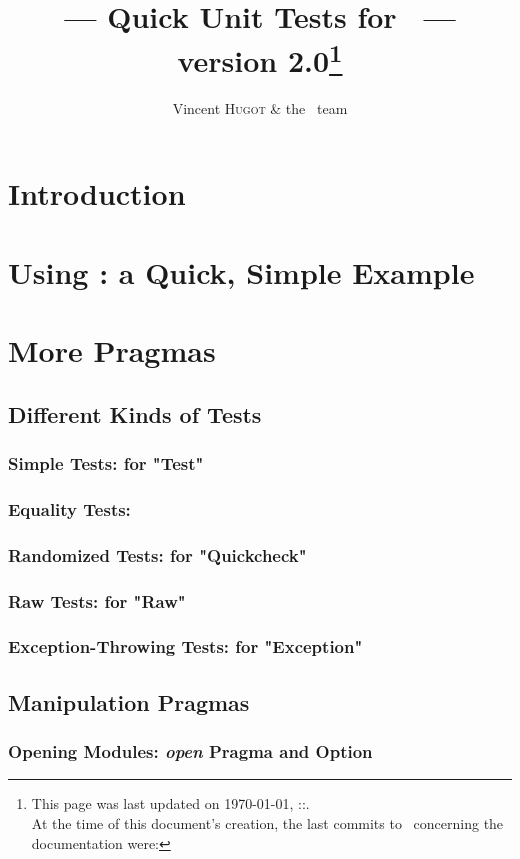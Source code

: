\documentclass[a4paper,12pt]{article}
\title{{\Huge\qtest}\\
--- Quick Unit Tests for \OCaml\ --- \\
version 2.0\footnote{
  This page was last updated on \today, \thehour:\theminute:\thesecond.\bigskip\\
%
At the time of this document's creation, the last commits to \bat\ concerning the documentation were:

%
%
}
}
\author{Vincent \textsc{Hugot} \& the \bat\ team}
\begin{document}
\maketitle
\tableofcontents

\section{Introduction}

\section{Using \qtest{} : a Quick, Simple Example}
    
\section{More \qtest{} Pragmas}
  \subsection{Different Kinds of Tests}
    \subsubsection{Simple Tests:  for "Test"}
    \subsubsection{Equality Tests: \textttl{=}}
    \subsubsection{Randomized Tests:  for "Quickcheck"}
    \subsubsection{Raw \ounit{} Tests:  for "Raw"}
    \subsubsection{Exception-Throwing Tests:  for "Exception"}
  \subsection{Manipulation Pragmas}
    \subsubsection{Opening Modules: \emph{open} Pragma  and  Option}
\end{document}
